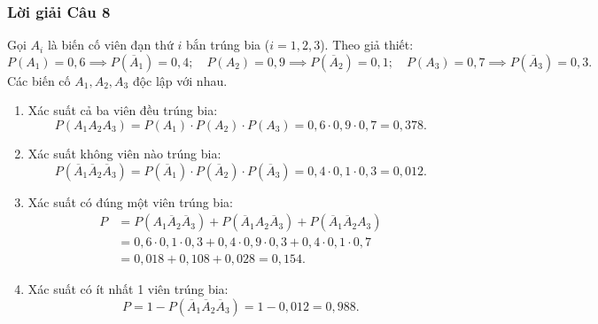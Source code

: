 \subsubsection*{Lời giải Câu 8}
Gọi $A_i$ là biến cố viên đạn thứ $i$ bắn trúng bia ($i = 1, 2, 3$).
Theo giả thiết:
\[
P(A_1) = 0{,}6 \implies P(\overline{A}_1) = 0{,}4; \quad
P(A_2) = 0{,}9 \implies P(\overline{A}_2) = 0{,}1; \quad
P(A_3) = 0{,}7 \implies P(\overline{A}_3) = 0{,}3.
\]
Các biến cố $A_1, A_2, A_3$ độc lập với nhau.
\begin{enumerate}[label=\alph*/]
    \item Xác suất cả ba viên đều trúng bia:
    \[
    P(A_1 A_2 A_3) = P(A_1) \cdot P(A_2) \cdot P(A_3) = 0{,}6 \cdot 0{,}9 \cdot 0{,}7 = 0{,}378.
    \]
    \item Xác suất không viên nào trúng bia:
    \[
    P(\overline{A}_1 \overline{A}_2 \overline{A}_3) = P(\overline{A}_1) \cdot P(\overline{A}_2) \cdot P(\overline{A}_3) = 0{,}4 \cdot 0{,}1 \cdot 0{,}3 = 0{,}012.
    \]
    \item Xác suất có đúng một viên trúng bia:
    \begin{align*}
    P &= P(A_1 \overline{A}_2 \overline{A}_3) + P(\overline{A}_1 A_2 \overline{A}_3) + P(\overline{A}_1 \overline{A}_2 A_3) \\
      &= 0{,}6 \cdot 0{,}1 \cdot 0{,}3 + 0{,}4 \cdot 0{,}9 \cdot 0{,}3 + 0{,}4 \cdot 0{,}1 \cdot 0{,}7 \\
      &= 0{,}018 + 0{,}108 + 0{,}028 = 0{,}154.
    \end{align*}
    \item Xác suất có ít nhất 1 viên trúng bia:
    \[
    P = 1 - P(\overline{A}_1 \overline{A}_2 \overline{A}_3) = 1 - 0{,}012 = 0{,}988.
    \]
\end{enumerate}

